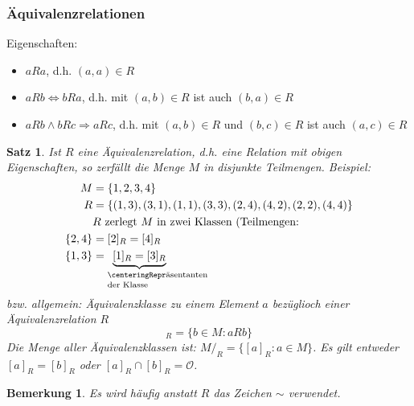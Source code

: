 \documentclass[12pt,a4paper]{article}%
\newtheorem{satz}{Satz}[section]
\newtheorem{bem}{Bemerkung}[section]
\numberwithin{equation}{section}
\def\colBlue#1{\begingroup\color{NavyBlue}{#1}\endgroup}
\numberwithin{equation}{subsection}
\begin{document}
	\subsubsection{Äquivalenzrelationen}
	  Eigenschaften:
	  \begin{itemize}
	    \item $aRa$, d.h. $(a,a) \in R$ \colBlue{(Reflexivität)}
	    \item $aRb \Leftrightarrow bRa$, d.h. mit $(a,b)\in R$ ist auch $(b,a) \in R$ \colBlue{(Symmetrie)}
	    \item $aRb \land bRc \Rightarrow aRc$, d.h. mit $(a,b) \in R$ und $(b,c) \in R$ ist auch $(a,c) \in R$ \colBlue{(Transitivität)}
	  \end{itemize}
	  \begin{satz}
	    Ist $R$ eine Äquivalenzrelation, d.h. eine Relation mit obigen Eigenschaften, so zerfällt die Menge $M$ in disjunkte Teilmengen. \newline
	    Beispiel:
	    \begin{align*}
	      M &= \lbrace 1,2,3,4\rbrace \\
	      R &= \lbrace(1,3),(3,1),(1,1),(3,3),(2,4),(4,2),(2,2),(4,4)\rbrace\\
	      &\text{$R$ zerlegt $M$ in zwei Klassen (Teilmengen:}\\
	      \lbrace 2,4\rbrace &= [2]_R = [4]_R\\
	      \lbrace 1,3\rbrace &= \underbrace{[1]_R = [3]_R}_{\text{\parbox{2cm}{\centering%
Repräsentanten \\[-1ex]der Klasse}}}
	    \end{align*}
	    bzw. allgemein: Äquivalenzklasse zu einem Element $a$ bezüglioch einer Äquivalenzrelation $R$
	    \begin{equation*}
	      [a]_R = \lbrace b \in M : aRb\rbrace
	    \end{equation*}
	    Die Menge aller Äquivalenzklassen ist: $M/_R = \lbrace[a]_R: a\in M\rbrace$. Es gilt entweder $[a]_R = [b]_R$ oder $[a]_R \cap [b]_R = \mathcal{O}$.
	  \end{satz}
	  \begin{bem}
	    Es wird häufig anstatt $R$ das Zeichen $\sim$ verwendet.
	  \end{bem}
\end{document}
